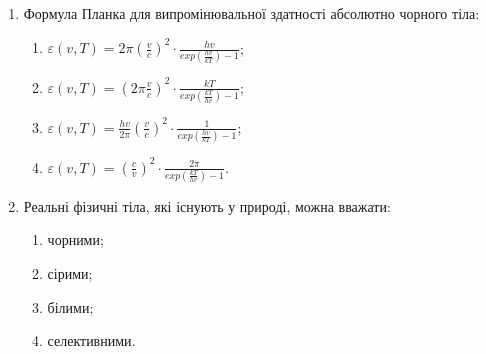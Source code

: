 \documentclass[twocolumn]{el-author}
\begin{document}
\begin{enumerate}
	\item Формула Планка для випромінювальної здатності абсолютно чорного тіла:
	\begin{enumerate}
		\item $\varepsilon (v,T) = 2 \pi (\frac{v}{c})^{2} \cdot \frac{hv}{exp(\frac{hv}{kT}) -1}$;
		\item $\varepsilon (v,T) = (2 \pi \frac{v}{c})^{2} \cdot \frac{kT}{exp(\frac{kT}{hv}) - 1}$;
		\item $\varepsilon (v,T) = \frac{hv}{2 \pi}(\frac{v}{c})^{2} \cdot \frac{1}{exp(\frac{hv}{kT}) - 1}$;
		\item $\varepsilon (v,T) = (\frac{c}{v})^{2} \cdot \frac{2 \pi}{exp(\frac{kT}{hv}) - 1}$.
	\end{enumerate}
	\item Реальні фізичні тіла, які існують у природі, можна вважати:
	\begin{enumerate}
		\item чорними;
		\item сірими;
		\item білими;
		\item селективними.
	\end{enumerate}
\end{enumerate}
\end{document}
